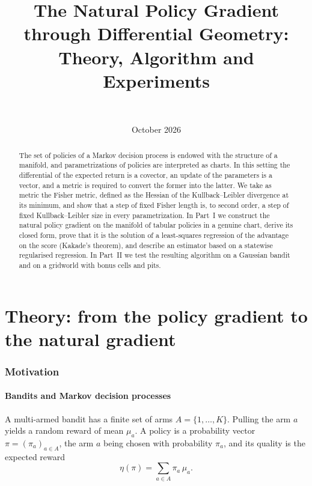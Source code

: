 \documentclass[11pt,a4paper]{article}
\title{The Natural Policy Gradient through Differential Geometry:\\
Theory, Algorithm and Experiments}
\author{\paperauthor\\[2pt]\small\paperaffil}
\date{October 2026}
\numberwithin{equation}{section}
\theoremstyle{plain}
\theoremstyle{definition}
\theoremstyle{remark}
\begin{document}
\maketitle

\begin{abstract}
\noindent
The set of policies of a Markov decision process is endowed with the structure of a manifold, and
parametrizations of policies are interpreted as charts. In this setting the differential of the
expected return is a covector, an update of the parameters is a vector, and a metric is required to
convert the former into the latter. We take as metric the Fisher metric, defined as the Hessian of the
Kullback--Leibler divergence at its minimum, and show that a step of fixed Fisher length is, to
second order, a step of fixed Kullback--Leibler size in every parametrization. In Part~I we construct
the natural policy gradient on the manifold of tabular policies in a genuine chart, derive its
closed form, prove that it is the solution of a least-squares regression of the advantage on the score
(Kakade's theorem), and describe an estimator based on a statewise regularised regression.
In Part~II we test the resulting algorithm on a Gaussian bandit and on a gridworld with bonus cells and pits.
\end{abstract}
\clearpage
\tableofcontents
\clearpage

\part{Theory: from the policy gradient to the natural gradient}

\section{Motivation}\label{sec:motivation}

\subsection{Bandits and Markov decision processes}

A multi-armed bandit has a finite set of arms $A=\{1,\dots,K\}$. Pulling the arm $a$ yields a random
reward of mean $\mu_a$. A policy is a probability vector $\pi=(\pi_a)_{a\in A}$, the arm $a$ being
chosen with probability $\pi_a$, and its quality is the expected reward
\[
  \eta(\pi)=\sum_{a\in A}\pi_a\,\mu_a .
\]
\end{document}
